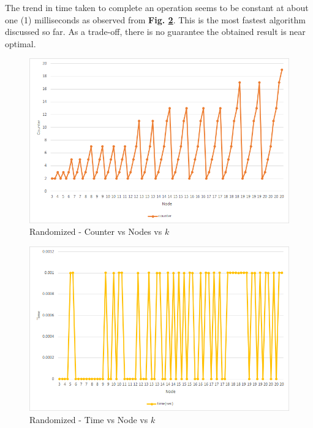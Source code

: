 \documentclass[longpaper, english, final, times]{revdetua}
\begin{document}
			The trend in time taken to complete an operation seems to be constant at about one (1) milliseconds as observed from \textbf{Fig. \ref{figure:randomizedTimeNodes20}}. This is the most fastest algorithm discussed so far. As a trade-off, there is no guarantee the obtained result is near optimal.
		
			\begin{figure}[!h]
				\includegraphics[width=1\linewidth]{imgs/randomizedCounterNodes20.png}
				\caption{Randomized - Counter vs Nodes vs $k$}
				\label{figure:randomizedCounterNodes20}
			\end{figure}
			
			\begin{figure}[!h]
				\includegraphics[width=1\linewidth]{imgs/randomizedTimeNodes20.png}
				\caption{Randomized - Time vs Node vs $k$}
				\label{figure:randomizedTimeNodes20}
			\end{figure}
			
\end{document}
